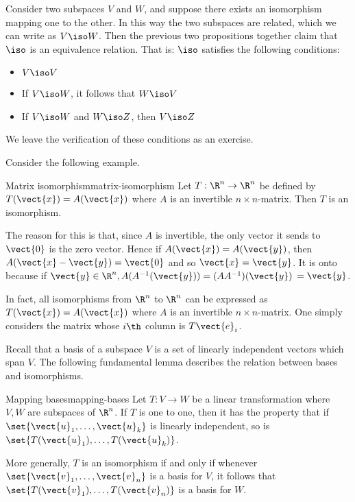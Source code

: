 Consider two subspaces $V$ and $W$, and suppose there exists an isomorphism mapping one to the other. In this way the two subspaces are related, which we can write as $V\iso W$. Then the previous two propositions together claim that $\iso$ is an equivalence relation. That is: $\iso$
satisfies the following conditions:

\begin{itemize}
\item $V\iso V$

\item If $V\iso W$, it follows that $W\iso V$

\item If $V\iso W$ and $W\iso Z$, then $V\iso Z$
\end{itemize}

We leave the verification of these conditions as an exercise.

Consider the following example. 

\begin{example}{Matrix isomorphism}{matrix-isomorphism}
Let $T:\R^{n}\rightarrow \R^{n}$ be defined by $T(\vect{x}) = A(\vect{x})$ where $A$ is an invertible $n\times n$-matrix. Then $T$ is
an isomorphism.
\end{example}

\begin{solution}
The reason for this is that, since $A$ is invertible, the only vector it
sends to $\vect{0}$ is the zero vector. Hence if $A(\vect{x})=A(\vect{y})$, then $A(\vect{x}-\vect{y}) =\vect{0}$ and so $\vect{x}=\vect{y}$. It is onto
because if $\vect{y}\in \R^{n},A(A^{-1} (\vect{y})) =(
AA^{-1}) (\vect{y})$ $=\vect{y}$. 
\end{solution}

In fact, all isomorphisms from $\R^{n}$ to $\R^{n}$ can be expressed as $T(\vect{x}) = A(\vect{x})$ where $A$ is an invertible $n \times n$-matrix. One
simply considers the matrix whose $i\th$ column is $T\vect{e}_{i}$.

Recall that a basis of a subspace $V$ is a set of linearly independent vectors which span $V$. The following fundamental lemma describes the relation between bases and
isomorphisms.

\begin{lemma}{Mapping bases}{mapping-bases}
Let $T:V\rightarrow W$ be a linear transformation where $V,W$ are
subspaces of $\R^n$. If $T$ is one to one, then it has the property that if $\set{\vect{u}_{1},\ldots,\vect{u}_{k}} $ is linearly independent, so is $\set{T(\vect{u}_{1}),\ldots,T(\vect{u}_{k})}$.

More generally, $T$ is an isomorphism if and only if whenever $\set{
\vect{v}_{1},\ldots,\vect{v}_{n}} $ is a basis for $V$, it follows that $\set{T
(\vect{v}_{1}),\ldots,T(\vect{v}_{n})} $ is a basis for $W$. 
\end{lemma}

